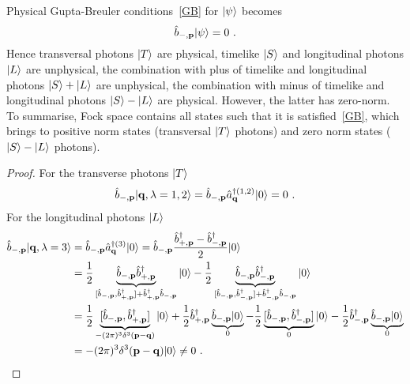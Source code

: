     Physical Gupta-Breuler conditions~\eqref{GB} for $\vert\psi\rangle$ becomes 
    \begin{equation*}
        \hat b_{-, \mathbf p} \vert\psi\rangle = 0 ~.
    \end{equation*} 
    Hence transversal photons $\vert T\rangle$ are physical, timelike $\vert S\rangle$ and longitudinal photons $\vert L\rangle$ are unphysical, the combination with plus of timelike and longitudinal photons $\vert S\rangle + \vert L\rangle$ are unphysical, the combination with minus of timelike and longitudinal photons $\vert S\rangle - \vert L\rangle$ are physical. However, the latter has zero-norm. To summarise, Fock space contains all states such that it is satisfied~\eqref{GB}, which brings to positive norm states (transversal $\vert T\rangle$ photons) and zero norm states ($\vert S\rangle - \vert L\rangle$ photons).
    \begin{proof}
        For the transverse photons $\vert T\rangle$
        \begin{equation*}
            \hat b_{-, \mathbf p} \vert\mathbf q, \lambda= 1,2\rangle = \hat b_{-, \mathbf p} \hat a_{\mathbf q}^{\dagger (1,2)} \vert0\rangle = 0 ~.
        \end{equation*}
        For the longitudinal photons $\vert L\rangle$
        \begin{equation*}
        \begin{aligned}
            \hat b_{-, \mathbf p} \ket{\mathbf q, \lambda=3} & = \hat b_{-, \mathbf p} \hat a_{\mathbf q}^{\dagger (3)} \ket{0} = \hat b_{-, \mathbf p} \frac{\hat b^\dagger_{+, \mathbf p} - \hat b^\dagger_{-, \mathbf p}}{2} \ket{0} \\ &  = \frac{1}{2} \underbrace{\hat b_{-, \mathbf p} \hat b^\dagger_{+, \mathbf p}}_{[\hat b_{-, \mathbf p} ,\hat b^\dagger_{+, \mathbf p}] + \hat b^\dagger_{+, \mathbf p} \hat b_{-, \mathbf p} } \ket{0} - \frac{1}{2} \underbrace{\hat b_{-, \mathbf p} \hat b^\dagger_{-, \mathbf p}}_{[\hat b_{-, \mathbf p}, \hat b^\dagger_{-, \mathbf p}] + \hat b^\dagger_{-, \mathbf p} \hat b_{-, \mathbf p}} \ket{0} \\ & = \frac{1}{2} \underbrace{[\hat b_{-, \mathbf p} ,\hat b^\dagger_{+, \mathbf p}]}_{- (2\pi)^3 \delta^3 (\mathbf p - \mathbf q)} \ket{0} + \frac{1}{2} \hat b^\dagger_{+, \mathbf p} \underbrace{\hat b_{-, \mathbf p} \ket{0}}_0 - \frac{1}{2} \underbrace{[\hat b_{-, \mathbf p}, \hat b^\dagger_{-, \mathbf p}]}_{0} \ket{0} - \frac{1}{2} \hat b^\dagger_{-, \mathbf p} \underbrace{\hat b_{-, \mathbf p} \ket{0}}_0 \\ & = - (2\pi)^3 \delta^3 (\mathbf p - \mathbf q) \ket{0} \neq 0 ~.
        \end{aligned}

\end{equation*}
\end{proof}
